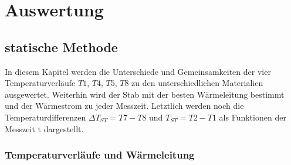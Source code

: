 \section{Auswertung}
\label{sec:Auswertung}

\subsection{statische Methode}
In diesem Kapitel werden die Unterschiede und Gemeinsamkeiten der vier 
Temperaturverläufe $T1$, $T4$, $T5$, $T8$ zu den unterschiedlichen Materialien 
ausgewertet. Weiterhin wird der Stab mit der besten Wärmeleitung bestimmt und 
der Wärmestrom zu jeder Messzeit. Letztlich werden noch die Temperaturdifferenzen 
$\Delta T_{ST}=T7-T8$ und $T_{ST}=T2-T1$ als Funktionen der Messzeit t dargestellt.

\subsubsection{Temperaturverläufe und Wärmeleitung}